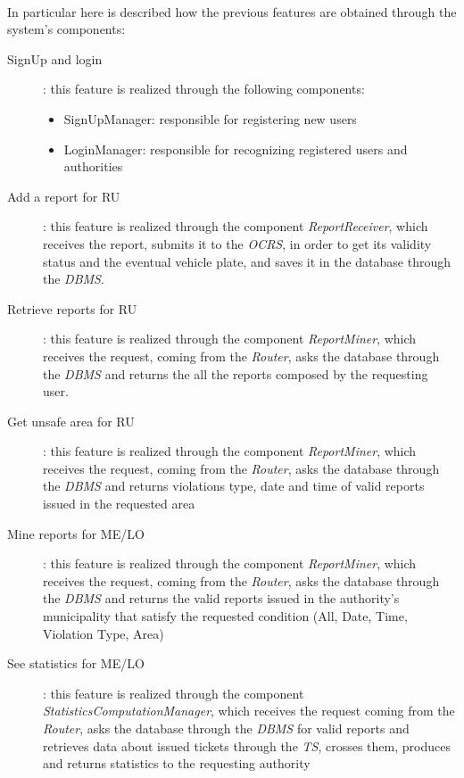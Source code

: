 		\paragraph{}
			In particular here is described how the previous features are obtained through the system's components:
			\begin{description}
				\item [SignUp and login]: this feature is realized through the following components:
					\begin{itemize}
						\item SignUpManager: responsible for registering new users
						\item LoginManager: responsible for recognizing registered users and authorities
					\end{itemize}
				\item [Add a report for RU]: this feature is realized through the component \textit{ReportReceiver}, which receives the report, submits it to the \textit{OCRS}, in order to get its validity status and the eventual vehicle plate, and saves it in the database through the \textit{DBMS}.
				\item [Retrieve reports for RU]: this feature is realized through the component \textit{ReportMiner}, which receives the request, coming from the \textit{Router}, asks the database through the \textit{DBMS} and returns the all the reports composed by the requesting user.
				\item [Get unsafe area for RU]: this feature is realized through the component \textit{ReportMiner}, which receives the request, coming from the \textit{Router}, asks the database through the \textit{DBMS} and returns violations type, date and time of valid reports issued in the requested area
				\item [Mine reports for ME/LO]: this feature is realized through the component \textit{ReportMiner}, which receives the request, coming from the \textit{Router}, asks the database through the \textit{DBMS} and returns the valid reports issued in the authority's municipality that satisfy the requested condition (All, Date, Time, Violation Type, Area)
				\item [See statistics for ME/LO]: this feature is realized through the component \textit{StatisticsComputationManager}, which receives the request coming from the \textit{Router}, asks the database through the \textit{DBMS} for valid reports and retrieves data about issued tickets through the \textit{TS}, crosses them, produces and returns statistics to the requesting authority

\end{description}
